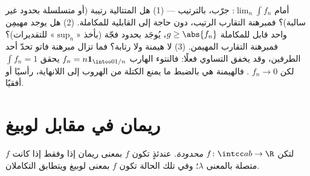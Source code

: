 \begin{method}\label{met:b3:lebesgue:convergence}
أمام $\lim_n\int f_n$: جرّب، بالترتيب --- (1) هل المتتالية
رتيبة (أو متسلسلة بحدود غير سالبة)؟ فمبرهنة التقارب الرتيب، دون
حاجة إلى القابلية للمكاملة. (2) هل يوجد مهيمِن واحد قابل
للمكاملة $g \geq \abs{f_n}$، يُوجَد بحدود فجّة (بأخذ «$\sup_n$» للتقديرات)؟
فمبرهنة التقارب المهيمن. (3) لا هيمنة ولا رتابة؟ فما تزال
مبرهنة فاتو تحدّ أحد الطرفين، وقد يخفق التساوي فعلًا: فالنتوء
الهارب $f_n = n\mathbf
1_{\intoo0{1/n}}$ يحقق $\int f_n = 1$ لكن $f_n \to 0$ . فالهيمنة هي بالضبط ما يمنع الكتلة من الهروب إلى
اللانهاية، رأسيًا أو أفقيًا.
\end{method}

\section{ريمان في مقابل لوبيغ}

\begin{theorem}
\label{thm:b3:lebesgue:riemann}
لتكن $f \colon \intcc ab \to \R$ \emph{محدودة}. عندئذٍ تكون $f$  بمعنى
ريمان إذا وفقط إذا كانت $f$ متصلة  بالمعنى
$\lambda$؛ وفي تلك الحالة تكون $f$  بمعنى لوبيغ
ويتطابق التكاملان.
\end{theorem}

